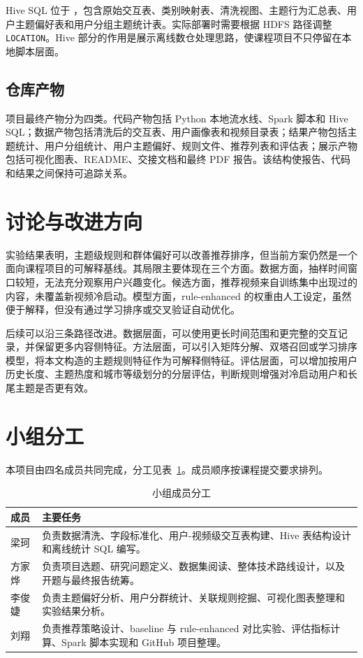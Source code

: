 \documentclass[UTF8,a4paper,12pt,fontset=none]{ctexart}
\begin{document}
Hive SQL 位于 ，包含原始交互表、类别映射表、清洗视图、主题行为汇总表、用户主题偏好表和用户分组主题统计表。实际部署时需要根据 HDFS 路径调整 \texttt{LOCATION}。Hive 部分的作用是展示离线数仓处理思路，使课程项目不只停留在本地脚本层面。

\subsection{仓库产物}

项目最终产物分为四类。代码产物包括 Python 本地流水线、Spark 脚本和 Hive SQL；数据产物包括清洗后的交互表、用户画像表和视频目录表；结果产物包括主题统计、用户分组统计、用户主题偏好、规则文件、推荐列表和评估表；展示产物包括可视化图表、README、交接文档和最终 PDF 报告。该结构使报告、代码和结果之间保持可追踪关系。

\section{讨论与改进方向}

实验结果表明，主题级规则和群体偏好可以改善推荐排序，但当前方案仍然是一个面向课程项目的可解释基线。其局限主要体现在三个方面。数据方面，抽样时间窗口较短，无法充分观察用户兴趣变化。候选方面，推荐视频来自训练集中出现过的内容，未覆盖新视频冷启动。模型方面，rule-enhanced 的权重由人工设定，虽然便于解释，但没有通过学习排序或交叉验证自动优化。

后续可以沿三条路径改进。数据层面，可以使用更长时间范围和更完整的交互记录，并保留更多内容侧特征。方法层面，可以引入矩阵分解、双塔召回或学习排序模型，将本文构造的主题规则特征作为可解释侧特征。评估层面，可以增加按用户历史长度、主题热度和城市等级划分的分层评估，判断规则增强对冷启动用户和长尾主题是否更有效。

\section{小组分工}

本项目由四名成员共同完成，分工见表~\ref{tab:roles}。成员顺序按课程提交要求排列。

\begin{table}[H]
\centering
\caption{小组成员分工}
\label{tab:roles}
\begin{tabular}{p{2.5cm}p{11cm}}
\toprule
成员 & 主要任务 \\
\midrule
梁珂 & 负责数据清洗、字段标准化、用户-视频级交互表构建、Hive 表结构设计和离线统计 SQL 编写。 \\
方家烨 & 负责项目选题、研究问题定义、数据集阅读、整体技术路线设计，以及开题与最终报告统筹。 \\
李俊婕 & 负责主题偏好分析、用户分群统计、关联规则挖掘、可视化图表整理和实验结果分析。 \\
刘翔 & 负责推荐策略设计、baseline 与 rule-enhanced 对比实验、评估指标计算、Spark 脚本实现和 GitHub 项目整理。 \\
\bottomrule
\end{tabular}
\end{table}
\end{document}
